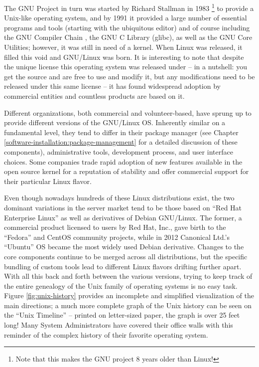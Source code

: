 The GNU Project in turn was started by Richard
Stallman in 1983
\footnote{Note that this makes the GNU project 8 years
older than Linux!} to provide a Unix-like operating
system, and by 1991 it provided a large number of
essential programs and tools (starting with the
ubiquitous  editor) and of course
including the GNU Compiler Chain , the GNU C Library (glibc), as well as the GNU Core
Utilities; however, it was still
in need of a kernel.  When Linux was released, it
filled this void and GNU/Linux was
born.  It is interesting to note that despite the
unique license this operating system was released
under -- in a nutshell: you get the source and are
free to use and modify it, but any modifications need
to be released under this same license -- it has found
widespread adoption by commercial entities and
countless products are based on it.

Different organizations, both commercial and
volunteer-based, have sprung up to provide different
versions of the GNU/Linux OS.  Inherently similar on a
fundamental level, they tend to differ in their
package manager (see Chapter
\ref{software-installation:package-management} for a
detailed discussion of these components), administrative
tools, development process, and user interface
choices.  Some companies trade rapid adoption of new
features available in the open source kernel for a
reputation of stability and offer commercial support
for their particular Linux flavor.

Even though nowadays hundreds of these Linux
distributions exist, the two dominant variations in
the server market tend to be those based on ``Red Hat
Enterprise Linux'' as
well as derivatives of Debian GNU/Linux.  The former, a commercial product licensed
to users by Red Hat, Inc., gave birth to the
``Fedora'' and CentOS community
projects, while in 2012 Canonical Ltd.'s ``Ubuntu''
OS became the most widely used Debian
derivative.  Changes to the core components continue
to be merged across all distributions, but the
specific bundling of custom tools lead to different
Linux flavors drifting further apart.  \\

With all this back and forth between the various
versions, trying to keep track of the entire genealogy
of the Unix family of operating systems is no easy
task.  Figure \ref{fig:unix-history} provides an
incomplete and simplified visualization of the main
directions; a much more complete graph of the Unix
history can be seen on the ``Unix
Timeline''\cite{history:levenez-history} -- printed on
letter-sized paper, the graph is over 25 feet long!
Many System Administrators have covered their office
walls with this reminder of the complex history of
their favorite operating system.  \\

